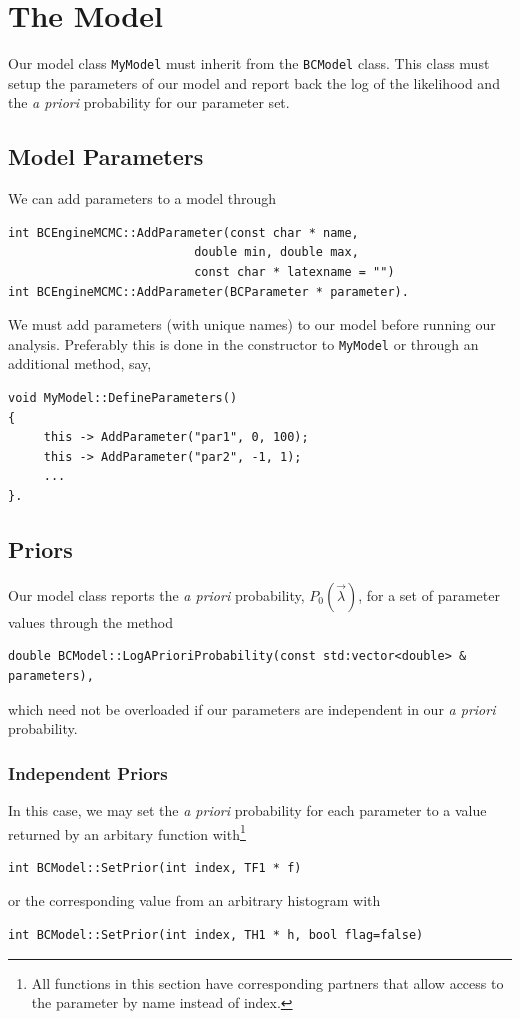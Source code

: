 \documentclass[a4paper,11pt]{article}
\newcommand{\Icode}[1]{\texttt{#1}}
\newcommand{\BPars}{\ensuremath{\vec{\lambda}}}
\newcommand{\BPrior}{\ensuremath{P_0(\BPars)}}
\begin{document}
\section{The Model}

Our model class \Icode{MyModel} must inherit from the \Icode{BCModel}
class. This class must setup the parameters of our model and report
back the log of the likelihood and the \emph{a priori} probability for
our parameter set.

\subsection{Model Parameters}

We can add parameters to a model through
\begin{verbatim}
int BCEngineMCMC::AddParameter(const char * name,
                          double min, double max,
                          const char * latexname = "")
int BCEngineMCMC::AddParameter(BCParameter * parameter).
\end{verbatim}
We must add parameters (with unique names) to our model before running
our analysis. Preferably this is done in the constructor to
\Icode{MyModel} or through an additional method, say,
\begin{verbatim}
void MyModel::DefineParameters()
{
     this -> AddParameter("par1", 0, 100);
     this -> AddParameter("par2", -1, 1);
     ...
}.
\end{verbatim}

\subsection{Priors}
Our model class reports the \emph{a priori} probability, \BPrior, for
a set of parameter values through the method
\begin{verbatim}
double BCModel::LogAPrioriProbability(const std:vector<double> & parameters),
\end{verbatim}
which need not be overloaded if our parameters are independent in our
\emph{a priori} probability.

\subsubsection{Independent Priors}

In this case, we may set the \emph{a priori} probability for each
parameter to a value returned by an arbitary function
with\footnote{All functions in this section have corresponding
  partners that allow access to the parameter by name instead of
  index.}
\begin{verbatim}
int BCModel::SetPrior(int index, TF1 * f)
\end{verbatim}
or the corresponding value from an arbitrary histogram with
\begin{verbatim}
int BCModel::SetPrior(int index, TH1 * h, bool flag=false)
\end{verbatim}
\end{document}
